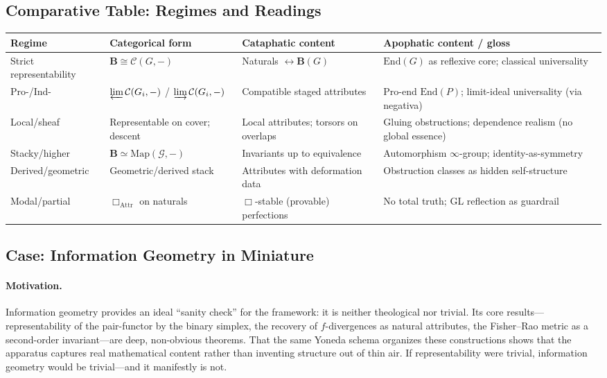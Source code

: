 \documentclass[11pt]{article}
\theoremstyle{upright}
\begin{document}
\subsection{Comparative Table: Regimes and Readings}\label{subsec:table}
\begin{center}\small
\begin{tabular}{p{3.1cm}p{4.2cm}p{4.2cm}p{4.2cm}}
\hline
\textbf{Regime} & \textbf{Categorical form} & \textbf{Cataphatic content} & \textbf{Apophatic content / gloss}\\
\hline
Strict representability & $\mathbf B\!\cong\!\mathcal C(G,-)$ & Naturals $\leftrightarrow \mathbf B(G)$ & $\mathrm{End}(G)$ as reflexive core; classical universality\\
Pro-/Ind- & $\varprojlim \mathcal C(G_i,-)$ / $\varinjlim \mathcal C(G_i,-)$ & Compatible staged attributes & Pro-end $\mathrm{End}(P)$; limit-ideal universality (via negativa)\\
Local/sheaf & Representable on cover; descent & Local attributes; torsors on overlaps & Gluing obstructions; dependence realism (no global essence)\\
Stacky/higher & $\mathbf B\simeq \mathrm{Map}(\mathcal G,-)$ & Invariants up to equivalence & Automorphism $\infty$-group; identity-as-symmetry\\
Derived/geometric & Geometric/derived stack & Attributes with deformation data & Obstruction classes as hidden self-structure\\
Modal/partial & $\Box_{\mathrm{Attr}}$ on naturals & $\Box$-stable (provable) perfections & No total truth; GL reflection as guardrail\\
\hline
\end{tabular}
\end{center}

\subsection{Case: Information Geometry in Miniature}\label{subsec:ig-mini}
\paragraph{Motivation.}
Information geometry provides an ideal ``sanity check” for the framework: it is neither theological nor trivial. Its core results—representability of the pair-functor by the binary simplex, the recovery of 
\(f\)-divergences as natural attributes, the Fisher–Rao metric as a second-order invariant—are deep, non-obvious theorems. That the same Yoneda schema organizes these constructions shows that the apparatus captures 
real mathematical content rather than inventing structure out of thin air. If representability were trivial, information geometry would be trivial—and it manifestly is not.
\end{document}
